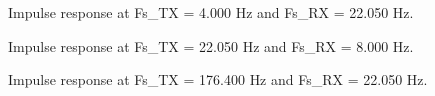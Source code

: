 \documentclass[final]{scrreprt} %
\begin{document}
\begin{figure}[H]
	\centering
	\setlength\figureheight{4cm}
    	\setlength{}
	
	\caption{Impulse response at Fs\_TX = 4.000 Hz and Fs\_RX = 22.050 Hz.}
	\label{fig:response_2}
\end{figure}

\begin{figure}[H]
	\centering
	\setlength\figureheight{4cm}
    	\setlength{}
	
	\caption{Impulse response at Fs\_TX = 22.050 Hz and Fs\_RX = 8.000 Hz.}
	\label{fig:response_3}
\end{figure}

\begin{figure}[H]
	\centering
	\setlength\figureheight{4cm}
    	\setlength{}
	
	\caption{Impulse response at Fs\_TX = 176.400 Hz and Fs\_RX = 22.050 Hz.}
	\label{fig:highest_freq}
\end{figure}
\end{document}
